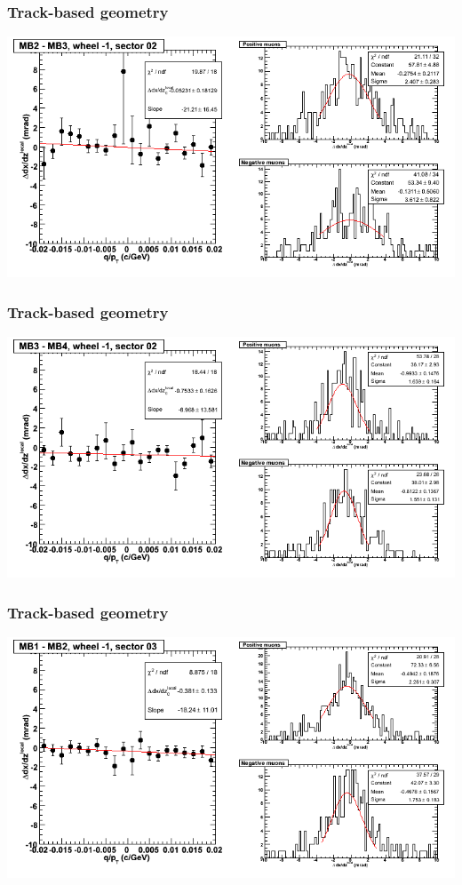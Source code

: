 \documentclass[compress]{beamer}
\begin{document}
\begin{frame}
\frametitle{Track-based geometry}
\includegraphics[width=\linewidth]{NOV4_segdiffs/dt13_slope_B_02_23.png}
\end{frame}

\begin{frame}
\frametitle{Track-based geometry}
\includegraphics[width=\linewidth]{NOV4_segdiffs/dt13_slope_B_02_34.png}
\end{frame}

\begin{frame}
\frametitle{Track-based geometry}
\includegraphics[width=\linewidth]{NOV4_segdiffs/dt13_slope_B_03_12.png}
\end{frame}
\end{document}
